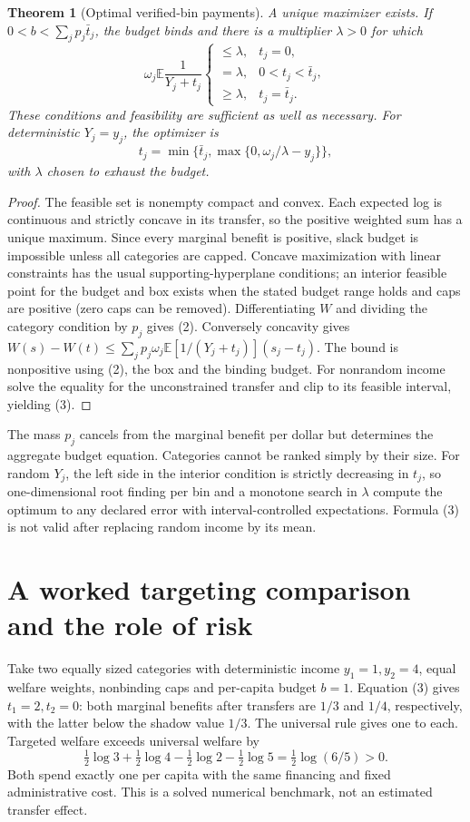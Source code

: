 \documentclass[11pt]{article}
\newtheorem{theorem}{Theorem}
\theoremstyle{definition}
\newcommand{\E}{\mathbb E}
\begin{document}
\begin{theorem}[Optimal verified-bin payments]
A unique maximizer exists. If $0<b<\sum_jp_j\bar t_j$, the budget binds and
there is a multiplier $\lambda>0$ for which
\[
 \omega_j\E\frac1{Y_j+t_j}
 \begin{cases}
 \le\lambda,&t_j=0,\\
 =\lambda,&0<t_j<\bar t_j,\\
 \ge\lambda,&t_j=\bar t_j.
 \end{cases}                                           \tag{2}
\]
These conditions and feasibility are sufficient as well as necessary.
For deterministic $Y_j=y_j$, the optimizer is
\[
 t_j=\min\{\bar t_j,\max\{0,\omega_j/\lambda-y_j\}\},   \tag{3}
\]
with $\lambda$ chosen to exhaust the budget.
\end{theorem}
\begin{proof}
The feasible set is nonempty compact and convex. Each expected log is continuous
and strictly concave in its transfer, so the positive weighted sum has a unique
maximum. Since every marginal benefit is positive, slack budget is impossible
unless all categories are capped. Concave maximization with linear constraints
has the usual supporting-hyperplane conditions; an interior feasible point for
the budget and box exists when the stated budget range holds and caps are
positive (zero caps can be removed). Differentiating $W$ and dividing the
category condition by $p_j$ gives (2). Conversely concavity gives
$W(s)-W(t)\le\sum_jp_j\omega_j\E[1/(Y_j+t_j)](s_j-t_j)$.
The bound is nonpositive using (2), the box and the binding budget. For
nonrandom income solve the equality for the unconstrained transfer and clip
to its feasible interval, yielding (3).
\end{proof}
The mass $p_j$ cancels from the marginal benefit per dollar but determines the
aggregate budget equation. Categories cannot be ranked simply by their size.
For random $Y_j$, the left side in the interior condition is strictly decreasing
in $t_j$, so one-dimensional root finding per bin and a monotone search in
$\lambda$ compute the optimum to any declared error with interval-controlled
expectations. Formula (3) is not valid after replacing random income by its mean.

\section*{A worked targeting comparison and the role of risk}
Take two equally sized categories with deterministic income $y_1=1,y_2=4$,
equal welfare weights, nonbinding caps and per-capita budget $b=1$.
Equation (3) gives $t_1=2,t_2=0$: both marginal benefits after transfers are
$1/3$ and $1/4$, respectively, with the latter below the shadow value $1/3$.
The universal rule gives one to each. Targeted welfare exceeds universal welfare by
\[
 \tfrac12\log3+\tfrac12\log4-
 \tfrac12\log2-\tfrac12\log5=\tfrac12\log(6/5)>0.
\]
Both spend exactly one per capita with the same financing and fixed administrative
cost. This is a solved numerical benchmark, not an estimated transfer effect.
\end{document}
